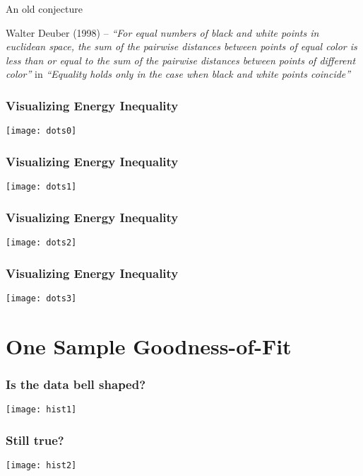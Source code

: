 \documentclass[presentation]{beamer}
\begin{document}
\begin{frame}{An old conjecture}
  \begin{block}{Walter Deuber (1998) -- }
    \textit{``For equal numbers of black and white points in euclidean
      space, the sum of the pairwise distances between points of equal
      color is less than or equal to the sum of the pairwise distances
      between points of different color''}  in
    \textit{``Equality holds only in the case when black and white
      points coincide''}
  \end{block}
\end{frame}

\begin{frame}
  \frametitle{Visualizing Energy Inequality}
  \begin{center}
    \texttt{[image: dots0]}
  \end{center}
\end{frame}

\begin{frame}
  \frametitle{Visualizing Energy Inequality}
  \begin{center}
    \texttt{[image: dots1]}
  \end{center}
\end{frame}


\begin{frame}
  \frametitle{Visualizing Energy Inequality}
  \begin{center}
    \texttt{[image: dots2]}
  \end{center}
\end{frame}


\begin{frame}
  \frametitle{Visualizing Energy Inequality}
  \begin{center}
    \texttt{[image: dots3]}
  \end{center}
\end{frame}


\section{One Sample Goodness-of-Fit}

\begin{frame}
  \frametitle{Is the data bell shaped?}
  \texttt{[image: hist1]}
\end{frame}

\begin{frame}
  \frametitle{Still true?}
  \texttt{[image: hist2]} 
\end{frame}
\end{document}
